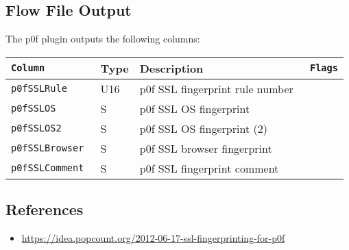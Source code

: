 \documentclass[documentation]{subfiles}
\begin{document}
\subsection{Flow File Output}
The p0f plugin outputs the following columns:
\begin{longtable}{>{\tt}lll>{\tt\small}l}
    \toprule
    {\bf Column} & {\bf Type} & {\bf Description} & {\bf Flags}\\
    \midrule\endhead%
    p0fSSLRule    & U16 & p0f SSL fingerprint rule number & \\
    p0fSSLOS      &   S & p0f SSL OS fingerprint          & \\
    p0fSSLOS2     &   S & p0f SSL OS fingerprint (2)      & \\
    p0fSSLBrowser &   S & p0f SSL browser fingerprint     & \\
    p0fSSLComment &   S & p0f SSL fingerprint comment     & \\
    \bottomrule
\end{longtable}

\subsection{References}
\begin{itemize}
    \item \url{https://idea.popcount.org/2012-06-17-ssl-fingerprinting-for-p0f}
\end{itemize}
\end{document}

